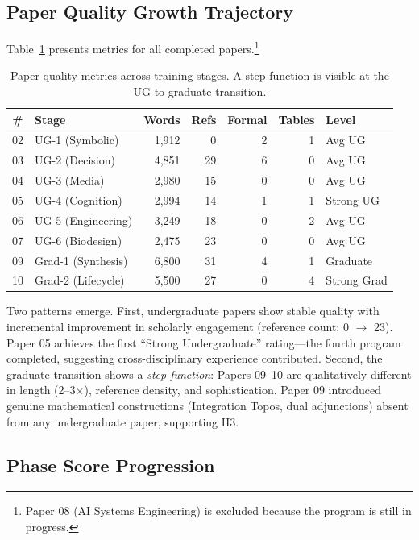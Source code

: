 \documentclass[11pt,a4paper]{article}
\begin{document}
\subsection{Paper Quality Growth Trajectory}
Table~\ref{tab:metrics} presents metrics for all completed papers.\footnote{Paper 08 (AI Systems Engineering) is excluded because the program is still in progress.}

\begin{table}[h]
\centering\small
\begin{tabular}{@{}clrrrrl@{}}
\toprule
\# & Stage & Words & Refs & Formal & Tables & Level \\
\midrule
02 & UG-1 (Symbolic) & 1,912 & 0 & 2 & 1 & Avg UG \\
03 & UG-2 (Decision) & 4,851 & 29 & 6 & 0 & Avg UG \\
04 & UG-3 (Media) & 2,980 & 15 & 0 & 0 & Avg UG \\
05 & UG-4 (Cognition) & 2,994 & 14 & 1 & 1 & Strong UG \\
06 & UG-5 (Engineering) & 3,249 & 18 & 0 & 2 & Avg UG \\
07 & UG-6 (Biodesign) & 2,475 & 23 & 0 & 0 & Avg UG \\
\midrule
09 & Grad-1 (Synthesis) & 6,800 & 31 & 4 & 1 & Graduate \\
10 & Grad-2 (Lifecycle) & 5,500 & 27 & 0 & 4 & Strong Grad \\
\bottomrule
\end{tabular}
\caption{Paper quality metrics across training stages. A step-function is visible at the UG-to-graduate transition.}
\label{tab:metrics}
\end{table}

Two patterns emerge. First, undergraduate papers show stable quality with incremental improvement in scholarly engagement (reference count: 0 $\to$ 23). Paper 05 achieves the first ``Strong Undergraduate'' rating---the fourth program completed, suggesting cross-disciplinary experience contributed. Second, the graduate transition shows a \emph{step function}: Papers 09--10 are qualitatively different in length (2--3$\times$), reference density, and sophistication. Paper 09 introduced genuine mathematical constructions (Integration Topos, dual adjunctions) absent from any undergraduate paper, supporting H3.

\subsection{Phase Score Progression}
\end{document}
